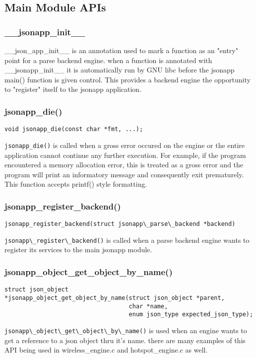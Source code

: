 \documentclass{article}
\begin{document}
\subsection{Main Module APIs}

\subsubsection{\_\_jsonapp\_init\_\_}
\_\_json\_app\_init\_\_ is an annotation used to mark a function as an "entry" point for a parse backend engine. when a function is annotated with \_\_jsonapp\_init\_\_ it is automatically run by GNU libc before the jsonapp main() function is given control. This provides a backend engine the opportunity to "register" itself to the jsonapp application.
\\
\subsubsection{jsonapp\_die()}
\begin{lstlisting}
void jsonapp_die(const char *fmt, ...);
\end{lstlisting}
\verb|jsonapp_die()| is called when a gross error occured on the engine or the entire application cannot continue any further execution. For example, if the program encountered a memory allocation error, this is treated as a gross error and the program will print an informatory message and consequently exit prematurely. This function accepts printf() style formatting.
\\
\subsubsection{jsonapp\_register\_backend()}
\begin{lstlisting}
jsonapp_register_backend(struct jsonapp\_parse\_backend *backend)
\end{lstlisting}
\verb|jsonapp\_register\_backend()| is called when a parse backend engine wants to register its services to the main jsonapp module.
\\
\subsubsection{jsonapp\_object\_get\_object\_by\_name()}
\begin{lstlisting}
struct json_object 
*jsonapp_object_get_object_by_name(struct json_object *parent,
                                   char *name,
                                   enum json_type expected_json_type);
\end{lstlisting}
\verb|jsonapp\_object\_get\_object\_by\_name()| is used when an engine wants to get a reference to a json object thru it's name. there are many examples of this API being used in wireless\_engine.c and hotspot\_engine.c as well.
\\
\end{document}
